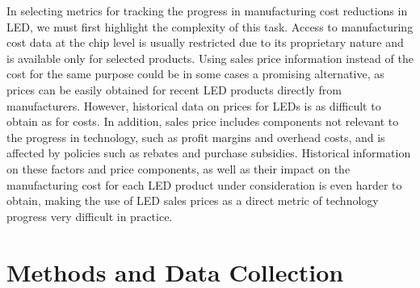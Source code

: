 \documentclass[twoside,twocolumn,9pt]{article}
\begin{document}
In selecting metrics for tracking the progress in manufacturing cost reductions in LED, we must first highlight  the complexity of this task. Access to manufacturing cost data at the chip level is usually restricted due to its proprietary nature and is available only for selected products. Using sales price information instead of the cost for the same purpose could be in some cases a promising alternative, as prices can be easily obtained for recent LED products directly from manufacturers. However, historical data on prices for LEDs is as difficult to obtain as for costs. In addition, sales price includes components not relevant to the progress in technology, such as profit margins and overhead costs, and is affected by policies such as rebates and purchase subsidies. Historical information on these factors and price components, as well as their impact on the manufacturing cost for each LED product under consideration is even harder to obtain, making the use of LED sales prices as a direct metric of technology progress very difficult in practice. 

\section{Methods and Data Collection}
\label{sec:methods}
\end{document}
